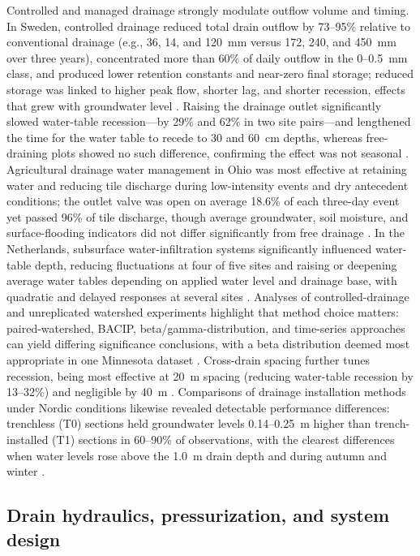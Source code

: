 Controlled and managed drainage strongly modulate outflow volume and timing. In Sweden, controlled drainage reduced total drain outflow by 73--95\% relative to conventional drainage (e.g., 36, 14, and 120~mm versus 172, 240, and 450~mm over three years), concentrated more than 60\% of daily outflow in the 0--0.5~mm class, and produced lower retention constants and near-zero final storage; reduced storage was linked to higher peak flow, shorter lag, and shorter recession, effects that grew with groundwater level \parencite{Wesström2003}. Raising the drainage outlet significantly slowed water-table recession---by 29\% and 62\% in two site pairs---and lengthened the time for the water table to recede to 30 and 60~cm depths, whereas free-draining plots showed no such difference, confirming the effect was not seasonal \parencite{Saadat2017}. Agricultural drainage water management in Ohio was most effective at retaining water and reducing tile discharge during low-intensity events and dry antecedent conditions; the outlet valve was open on average 18.6\% of each three-day event yet passed 96\% of tile discharge, though average groundwater, soil moisture, and surface-flooding indicators did not differ significantly from free drainage \parencite{Miller2022}. In the Netherlands, subsurface water-infiltration systems significantly influenced water-table depth, reducing fluctuations at four of five sites and raising or deepening average water tables depending on applied water level and drainage base, with quadratic and delayed responses at several sites \parencite{vandeCraats2025}. Analyses of controlled-drainage and unreplicated watershed experiments highlight that method choice matters: paired-watershed, BACIP, beta/gamma-distribution, and time-series approaches can yield differing significance conclusions, with a beta distribution deemed most appropriate in one Minnesota dataset \parencite{Pagliari2021}. Cross-drain spacing further tunes recession, being most effective at 20~m spacing (reducing water-table recession by 13--32\%) and negligible by 40~m \parencite{Vaiciukynas2015}. Comparisons of drainage installation methods under Nordic conditions likewise revealed detectable performance differences: trenchless (T0) sections held groundwater levels 0.14--0.25~m higher than trench-installed (T1) sections in 60--90\% of observations, with the clearest differences when water levels rose above the 1.0~m drain depth and during autumn and winter \parencite{Salo2019}.

\subsection{Drain hydraulics, pressurization, and system design}

